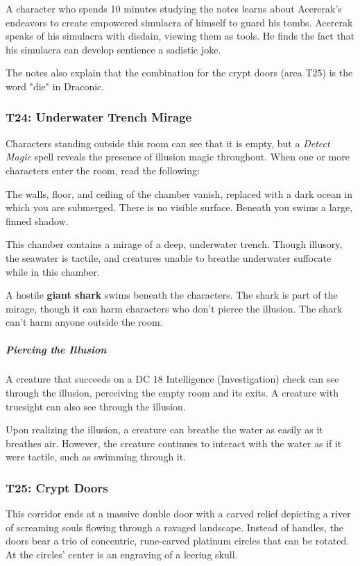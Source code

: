 \documentclass[10pt,a4paper,twoside,bg=print,twocolumn,openany,nodeprecatedcode]{dndbook}
\begin{document}
A character who spends 10 minutes studying the notes learns about Acererak's endeavors to create empowered simulacra of himself to guard his tombs. Acererak speaks of his simulacra with disdain, viewing them as tools. He finds the fact that his simulacra can develop sentience a sadistic joke.

The notes also explain that the combination for the crypt doors (area T25) is the word "die" in Draconic.

\subsubsection{T24: Underwater Trench Mirage}
Characters standing outside this room can see that it is empty, but a \textit{Detect Magic} spell reveals the presence of illusion magic throughout. When one or more characters enter the room, read the following:

\begin{DndReadAloud}{}
The walls, floor, and ceiling of the chamber vanish, replaced with a dark ocean in which you are submerged. There is no visible surface. Beneath you swims a large, finned shadow.

\end{DndReadAloud}

This chamber contains a mirage of a deep, underwater trench. Though illusory, the seawater is tactile, and creatures unable to breathe underwater suffocate while in this chamber.

A hostile \textbf{giant shark} swims beneath the characters. The shark is part of the mirage, though it can harm characters who don't pierce the illusion. The shark can't harm anyone outside the room.

\subparagraph{Piercing the Illusion}
A creature that succeeds on a DC 18 Intelligence (Investigation) check can see through the illusion, perceiving the empty room and its exits. A creature with truesight can also see through the illusion.

Upon realizing the illusion, a creature can breathe the water as easily as it breathes air. However, the creature continues to interact with the water as if it were tactile, such as swimming through it.

\subsubsection{T25: Crypt Doors}
\begin{DndReadAloud}{}
This corridor ends at a massive double door with a carved relief depicting a river of screaming souls flowing through a ravaged landscape. Instead of handles, the doors bear a trio of concentric, rune-carved platinum circles that can be rotated. At the circles' center is an engraving of a leering skull.

\end{DndReadAloud}
\end{document}
